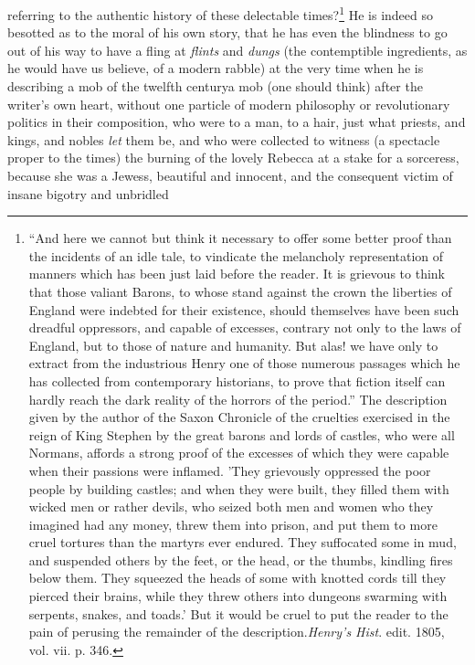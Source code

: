 referring to the authentic history of these delectable times?\footnote{``And here we cannot but think it necessary to offer
some better proof than the incidents of an idle tale, to vindicate
the melancholy representation of manners which has been just laid
before the reader. It is grievous to think that those valiant
Barons, to whose stand against the crown the liberties of England
were indebted for their existence, should themselves have been
such dreadful oppressors, and capable of excesses, contrary not
only to the laws of England, but to those of nature and
humanity. But alas! we have only to extract from the industrious
Henry one of those numerous passages which he has collected from
contemporary historians, to prove that fiction itself can hardly
reach the dark reality of the horrors of the period.''
The description given by the author of the Saxon Chronicle of the
cruelties exercised in the reign of King Stephen by the great
barons and lords of castles, who were all Normans, affords a
strong proof of the excesses of which they were capable when their
passions were inflamed.  'They grievously oppressed the poor
people by building castles; and when they were built, they filled
them with wicked men or rather devils, who seized both men and
women who they imagined had any money, threw them into prison, and
put them to more cruel tortures than the martyrs ever
endured. They suffocated some in mud, and suspended others by the
feet, or the head, or the thumbs, kindling fires below them. They
squeezed the heads of some with knotted cords till they pierced
their brains, while they threw others into dungeons swarming with
serpents, snakes, and toads.' But it would be cruel to put the
reader to the pain of perusing the remainder of the
description.\textemdash \emph{Henry's Hist}. edit. 1805, vol.  vii. p. 346.}
He is indeed so besotted as to the moral of his own story, that he
has even the blindness to go out of his way to have a fling at
\emph{flints} and \emph{dungs} (the contemptible ingredients, as he would
have us believe, of a modern rabble) at the very time when he is
describing a mob of the twelfth century\textemdash a mob (one should think)
after the writer's own heart, without one particle of modern
philosophy or revolutionary politics in their composition, who
were to a man, to a hair, just what priests, and kings, and nobles
\emph{let} them be, and who were collected to witness (a spectacle
proper to the times) the burning of the lovely Rebecca at a stake
for a sorceress, because she was a Jewess, beautiful and innocent,
and the consequent victim of insane bigotry and unbridled
